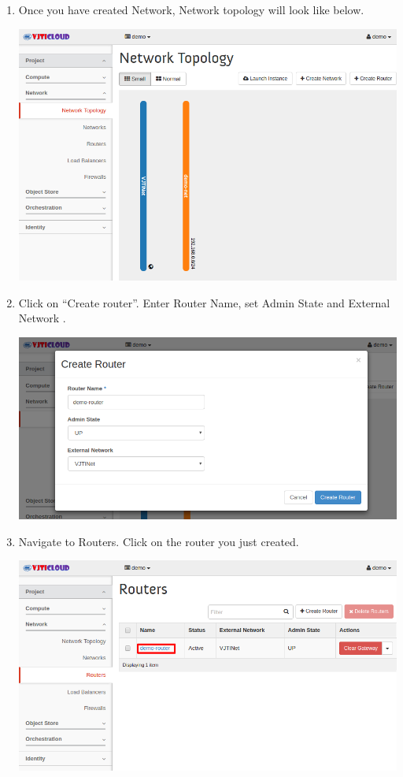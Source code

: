 \documentclass[letterpaper,10pt,english]{sphinxmanual}
\begin{document}
\begin{enumerate}
\item {} 
Once you have created Network, Network topology will look like below.

\includegraphics{nt-network-topology-demo-net.png}

\item {} 
Click on ``Create router''. Enter Router Name, set Admin State  and External Network .

\includegraphics{nt-create-router.png}

\item {} 
Navigate to Routers. Click on the router you just created.

\includegraphics{nt-routers.png}


\end{enumerate}
\end{document}
